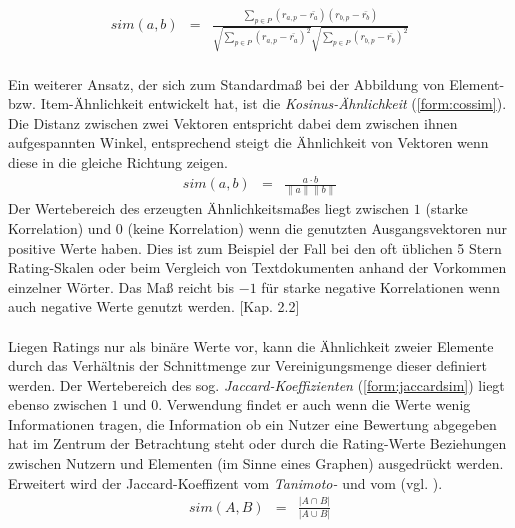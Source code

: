 \begin{eqnarray}
\label{form:pearsonsim}
sim(a,b) & = & \frac{\sum_{p \in P} (r_{a,p}-\bar{r_a})(r_{b,p}-\bar{r_b})}{\sqrt{\sum_{p \in P} (r_{a,p}-\bar{r_a})^2 }\sqrt{\sum_{p \in P} (r_{b,p}-\bar{r_b})^2 }}
\end{eqnarray}

\paragraph{} Ein weiterer Ansatz, der sich zum Standardmaß bei der Abbildung von Element- bzw. Item-Ähnlichkeit entwickelt hat, ist die \textit{Kosinus-Ähnlichkeit} (\ref{form:cossim}). Die Distanz zwischen zwei Vektoren entspricht dabei dem zwischen ihnen aufgespannten Winkel, entsprechend steigt die Ähnlichkeit von Vektoren wenn diese in die gleiche Richtung zeigen. 
\begin{eqnarray}
\label{form:cossim}
sim(a,b) & = & \frac{a \cdot b}{\|a\| \|b\|}
\end{eqnarray}
Der Wertebereich des erzeugten Ähnlichkeitsmaßes liegt zwischen $1$ (starke Korrelation) und $0$ (keine Korrelation) wenn die genutzten Ausgangsvektoren nur positive Werte haben. Dies ist zum Beispiel der Fall bei den oft üblichen 5 Stern Rating-Skalen oder beim Vergleich von Textdokumenten anhand der Vorkommen einzelner Wörter. Das Maß reicht bis $-1$ für starke negative Korrelationen wenn auch negative Werte genutzt werden. \citep{rs}[Kap. 2.2]

\paragraph{} Liegen Ratings nur als binäre Werte vor, kann die Ähnlichkeit zweier Elemente durch das Verhältnis der Schnittmenge zur Vereinigungsmenge dieser definiert werden. Der Wertebereich des sog. \textit{Jaccard-Koeffizienten} (\ref{form:jaccardsim}) liegt ebenso zwischen $1$ und $0$. Verwendung findet er auch wenn die Werte wenig Informationen tragen, die Information ob ein Nutzer eine Bewertung abgegeben hat im Zentrum der Betrachtung steht oder durch die Rating-Werte Beziehungen zwischen Nutzern und Elementen (im Sinne eines Graphen) ausgedrückt werden. Erweitert wird der Jaccard-Koeffizent vom \textit{Tanimoto-} und vom \textit{} (vgl. \citep{Bogers09collaborativeand}). \citep[Kap. 3.1]{rs} \citep{pci}
\begin{eqnarray}
\label{form:jaccardsim}
sim(A,B) & = & \frac{|A \cap B|}{|A \cup B|}
\end{eqnarray}


